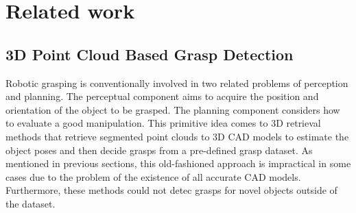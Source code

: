 \section{Related work}
\label{sec:related_work}

\subsection{3D Point Cloud Based Grasp Detection}
Robotic grasping is conventionally involved in two related problems of perception and planning. The perceptual component aims to acquire the position and orientation of the object to be grasped. The planning component considers how to evaluate a good manipulation. This primitive idea comes to 3D retrieval methods that retrieve segmented point clouds to 3D CAD models to estimate the object poses and then decide grasps from a pre-defined grasp dataset. As mentioned in previous sections, this old-fashioned approach is impractical in some cases due to the problem of the existence of all accurate CAD models. Furthermore, these methods could not detec grasps for novel objects outside of the dataset. 


